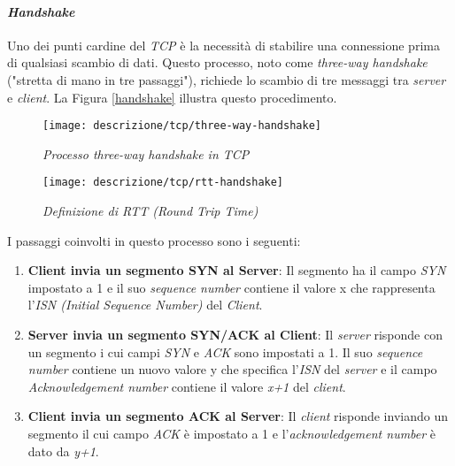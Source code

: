 \paragraph{\textit{Handshake}}

\noindent Uno dei punti cardine del \emph{TCP} è la necessità di stabilire una connessione prima di qualsiasi scambio di dati. Questo processo, noto come \emph{three-way handshake} ("stretta di mano in tre passaggi"), richiede lo scambio di tre messaggi tra \emph{server} e \emph{client}. La Figura \ref{handshake} illustra questo procedimento.

\begin{figure}[!h]
    \centering
    \begin{minipage}{0.48\textwidth}
        \centering
        \texttt{[image: descrizione/tcp/three-way-handshake]}
        \caption{\emph{Processo three-way handshake in TCP}}
        \label{handshake}
    \end{minipage}
    \hfill
    \begin{minipage}{0.48\textwidth}
        \centering
        \texttt{[image: descrizione/tcp/rtt-handshake]}
        \caption{\emph{Definizione di RTT (Round Trip Time)}}
        \label{rtt}
    \end{minipage}
\end{figure}

\noindent I passaggi coinvolti in questo processo sono i seguenti: 

\begin{enumerate}
    \item \textbf{Client invia un segmento SYN al Server}: Il segmento ha il campo \emph{SYN} impostato a 1 e il suo \emph{sequence number} contiene il valore x che rappresenta l'\emph{ISN (Initial Sequence Number)} del \emph{Client}.
    \item \textbf{Server invia un segmento SYN/ACK al Client}: Il \emph{server} risponde con un segmento i cui campi \emph{SYN} e \emph{ACK} sono impostati a 1. Il suo \emph{sequence number} contiene un nuovo valore y che specifica l'\emph{ISN} del \emph{server} e il campo \emph{Acknowledgement number} contiene il valore \emph{x+1} del \emph{client}.
    \item \textbf{Client invia un segmento ACK al Server}: Il \emph{client} risponde inviando un segmento il cui campo \emph{ACK} è impostato a 1 e l'\emph{acknowledgement number} è dato da \emph{y+1}.
\end{enumerate}

